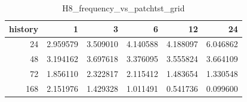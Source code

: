 \begin{table}
\caption{H8_frequency_vs_patchtst_grid}
\label{tab:H8_frequency_vs_patchtst_grid}
\begin{tabular}{rrrrrr}
\toprule
history & 1 & 3 & 6 & 12 & 24 \\
\midrule
24 & 2.959579 & 3.509010 & 4.140588 & 4.188097 & 6.046862 \\
48 & 3.194162 & 3.697618 & 3.376095 & 3.555824 & 3.664109 \\
72 & 1.856110 & 2.322817 & 2.115412 & 1.483654 & 1.330548 \\
168 & 2.151976 & 1.429328 & 1.011491 & 0.541736 & 0.099600 \\
\bottomrule
\end{tabular}
\end{table}
